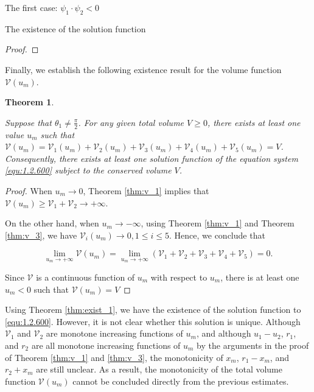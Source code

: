 \documentclass[letterpaper,reqno,10pt,twoside]{amsart}
\newtheorem{theorem}{Theorem}[section]
\theoremstyle{definition}
\theoremstyle{remark}
\begin{document}
\begin{section}{The first case: $\psi_1\cdot \psi_2<0$ }
\begin{subsection}{The existence of the solution function}
\begin{proof}
    \end{proof}
    
    Finally, we establish the following existence result for the volume function $\mathscr{V}(u_{m})$.
    
    \begin{theorem}{\label{thm:exist_1}}

    Suppose that $\theta_1\neq \frac{\pi}{2}$.
        For any given total volume $V\geq 0$, there exists at least one value $u_m$ such that $\mathscr{V}(u_m)=\mathscr{V}_{1}(u_m)+\mathscr{V}_{2}(u_m)+\mathscr{V}_{3}(u_m)+\mathscr{V}_{4}(u_m)+\mathscr{V}_{5}(u_m)= V$. Consequently, there exists at least one solution function of the equation system \eqref{equ:1.2.600} subject to the conserved volume $V$.
    \end{theorem}

    \begin{proof}

        When $u_{m}\rightarrow 0$, Theorem \ref{thm:v_1} implies that $\mathscr{V}(u_{m})\geq \mathscr{V}_1+\mathscr{V}_2\rightarrow +\infty$.

        On the other hand, when $u_m\rightarrow -\infty$, using Theorem \ref{thm:v_1} and Theorem \ref{thm:v_3}, we have $\mathscr{V}_{i}(u_{m})\rightarrow 0,1\leq i\leq 5$. Hence, we conclude that

        \begin{equation*}
            \lim_{u_{m}\rightarrow +\infty}\mathscr{V}(u_{m})=\lim_{u_{m}\rightarrow +\infty}(\mathscr{V}_{1}+\mathscr{V}_{2}+\mathscr{V}_{3}+\mathscr{V}_{4}+\mathscr{V}_{5})=0.
        \end{equation*}
        

        Since $\mathscr{V}$ is a continuous function of $u_m$ with respect to $u_{m}$, there is at least one $u_m<0$ such that $\mathscr{V}(u_m)=V$
    \end{proof}

      Using Theorem \ref{thm:exist_1}, we have the existence of the solution function to \eqref{equ:1.2.600}. However,  it is not clear whether this solution is unique. Although $\mathscr{V}_{1}$ and $\mathscr{V}_{2}$ are monotone increasing functions of $u_{m}$, and although $u_1-u_2$, $r_1$, and $r_{2}$ are all monotone increasing functions of $u_{m}$ by the arguments in the proof of Theorem \ref{thm:v_1} and \ref{thm:v_3}, the monotonicity of $x_{m}$, $r_1-x_m$, and $r_{2}+x_{m}$ are still unclear. As a result, the monotonicity of the total volume function $\mathscr{V}(u_{m})$ cannot be concluded directly from the previous estimates.
      

\end{subsection}
\end{section}
\end{document}
